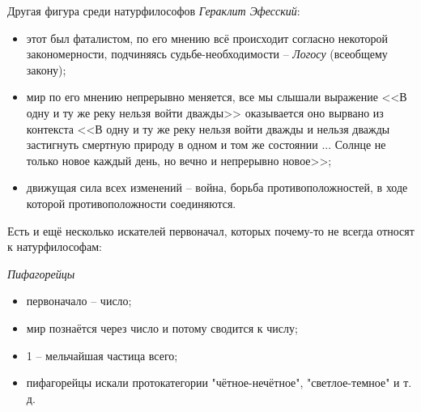 Другая фигура среди натурфилософов \textit{Гераклит Эфесский}:
\begin{itemize}
	\item этот был фаталистом, по его мнению всё происходит согласно некоторой закономерности, подчиняясь судьбе-необходимости -- \textit{Логосу} (всеобщему закону); 
	\item мир по его мнению непрерывно меняется, все мы слышали выражение <<В одну и ту же реку нельзя войти дважды>> оказывается оно вырвано из контекста <<В одну и ту же реку нельзя войти дважды и нельзя дважды застигнуть смертную природу в одном и том же состоянии ... Солнце не только новое каждый день, но вечно и непрерывно новое>>;
	\item движущая сила всех изменений -- война, борьба противоположностей, в ходе которой противоположности соединяются.
\end{itemize}

Есть и ещё несколько искателей первоначал, которых почему-то не всегда относят к натурфилософам:

\textit{Пифагорейцы}
\begin{itemize}
	\item первоначало -- число; 
	\item мир познаётся через число и потому сводится к числу;
	\item 1 -- мельчайшая частица всего;
	\item пифагорейцы искали протокатегории "чётное-нечётное", "светлое-темное" и т. д.
\end{itemize}

